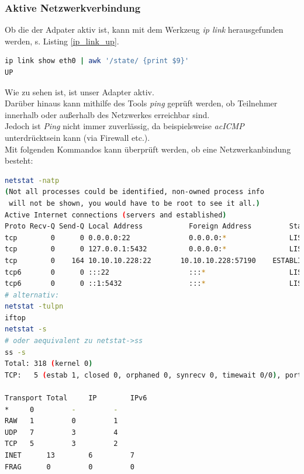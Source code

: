 \documentclass[paper=a4,fontsize=11pt]{scrartcl}%
\numberwithin{equation}{section}
\begin{document}
\subsubsection{Aktive Netzwerkverbindung} \label{aktive_verbindung}
Ob die der Adpater aktiv ist, kann mit dem Werkzeug \emph{ip link} herausgefunden werden, s. Listing \ref{ip_link_up}.
	\begin{lstlisting}[style=Bash, language=Bash, label=ip_link_up]
ip link show eth0 | awk '/state/ {print $9}'
UP
\end{lstlisting}
Wie zu sehen ist, ist unser Adapter aktiv.\\
Darüber hinaus kann mithilfe des Tools \emph{ping} geprüft werden, ob Teilnehmer innerhalb oder außerhalb des Netzwerkes erreichbar sind.\\
Jedoch ist \emph{Ping} nicht immer zuverlässig, da beispielsweise \emph{ac{ICMP}} \glqq unterdrückt\grqq sein kann (via Firewall etc.).\\

Mit folgenden Kommandos kann überprüft werden, ob eine Netzwerkanbindung besteht:
\begin{lstlisting}[style=Bash, language=Bash, label=ip_link_up]
netstat -natp
(Not all processes could be identified, non-owned process info
 will not be shown, you would have to be root to see it all.)
Active Internet connections (servers and established)
Proto Recv-Q Send-Q Local Address           Foreign Address         State       PID/Program name    
tcp        0      0 0.0.0.0:22              0.0.0.0:*               LISTEN      -                   
tcp        0      0 127.0.0.1:5432          0.0.0.0:*               LISTEN      -                   
tcp        0    164 10.10.10.228:22       10.10.10.228:57190    ESTABLISHED -                   
tcp6       0      0 :::22                   :::*                    LISTEN      -                   
tcp6       0      0 ::1:5432                :::*                    LISTEN      - 
# alternativ:
netstat -tulpn
iftop
netstat -s
# oder aequivalent zu netstat->ss
ss -s
Total: 318 (kernel 0)
TCP:   5 (estab 1, closed 0, orphaned 0, synrecv 0, timewait 0/0), ports 0

Transport Total     IP        IPv6
*	  0         -         -        
RAW	  1         0         1        
UDP	  7         3         4        
TCP	  5         3         2        
INET	  13        6         7        
FRAG	  0         0         0 
\end{lstlisting}
\end{document}
